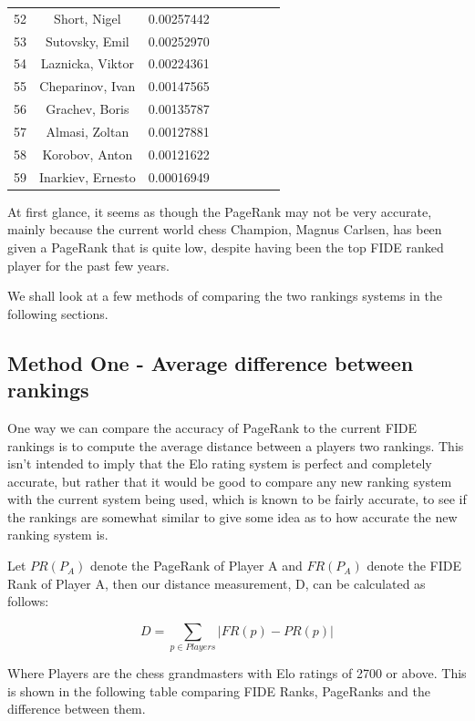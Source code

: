 \documentclass[pdftex,11pt,a4paper]{report}
\begin{document}
\begin{singlespace}
\begin{tabular}{l*{6}{c}r}
52 & Short, Nigel & 0.00257442 \\
53 & Sutovsky, Emil & 0.00252970 \\
54 & Laznicka, Viktor & 0.00224361 \\
55 & Cheparinov, Ivan & 0.00147565 \\
56 & Grachev, Boris & 0.00135787 \\
57 & Almasi, Zoltan & 0.00127881 \\
58 & Korobov, Anton & 0.00121622 \\
59 & Inarkiev, Ernesto & 0.00016949 \\
\end{tabular}
\end{singlespace}

At first glance, it seems as though the PageRank may not be very accurate, mainly because the current world chess Champion,
Magnus Carlsen, has been given a PageRank that is quite low, despite having
been the top FIDE ranked player for the past few years.

We shall look at a few methods of comparing the two rankings systems in the following sections.

\subsection{Method One - Average difference between rankings}

One way we can compare the accuracy of PageRank to the current FIDE rankings is to 
compute the average distance between a players two rankings. This isn't intended to imply that the
Elo rating system is perfect and completely accurate, but rather that it would be good to compare
any new ranking system with the current system being used, which is known to be fairly accurate,
    to see if the rankings are somewhat similar
to give some idea as to how accurate the new ranking system is.

Let $PR(P_A)$ denote the PageRank 
of Player A and $FR(P_A)$ denote the FIDE Rank of Player A, then our distance measurement, D, can be
calculated as follows:

$$
   D = \sum\limits_{p \in Players} | FR(p) - PR(p) |
$$

Where Players are the chess grandmasters with Elo ratings of 2700 or above. This is shown in the following table
comparing FIDE Ranks, PageRanks and the difference between them.
\end{document}
